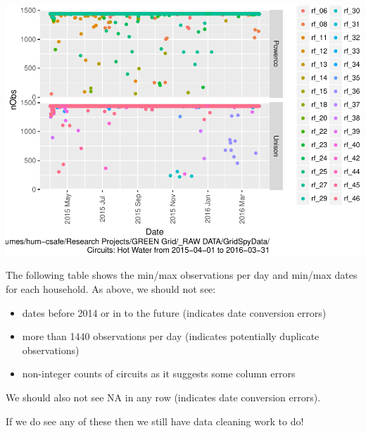 \documentclass[]{article}
\providecommand{\tightlist}{%
  \setlength{\itemsep}{0pt}\setlength{\parskip}{0pt}}
\begin{document}
\includegraphics{nzGGHouseholdPowerDemandProfile_Hot Water_2015-04-01_2016-03-31_files/figure-latex/loadedFilesObs point plot-1.pdf}

The following table shows the min/max observations per day and min/max
dates for each household. As above, we should not see:

\begin{itemize}
\tightlist
\item
  dates before 2014 or in to the future (indicates date conversion
  errors)
\item
  more than 1440 observations per day (indicates potentially duplicate
  observations)
\item
  non-integer counts of circuits as it suggests some column errors
\end{itemize}

We should also not see NA in any row (indicates date conversion errors).

If we do see any of these then we still have data cleaning work to do!
\end{document}
